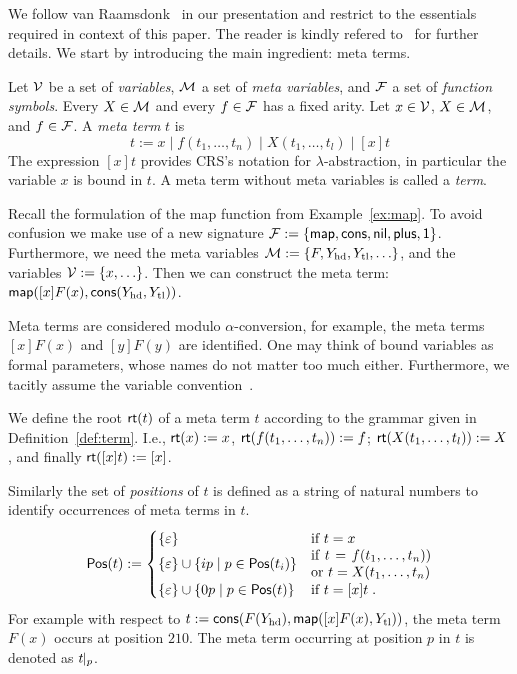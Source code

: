 We follow van Raamsdonk~\cite{2003_van_raamsdonk} in our presentation 
and restrict to the essentials required in context of this paper. The
reader is kindly refered to~\cite{2003_van_raamsdonk} for further details.
We start by introducing the main ingredient: meta terms. 
%
\begin{definition} \label{def:term} 
  Let $\mathcal{V}$ be a set of \emph{variables}, $\mathcal{M}$ a set of \emph{meta
    variables}, and $\mathcal{F}$ a set of \emph{function symbols}. Every
  $X \in \mathcal{M}$ and every $f \in \mathcal{F}$ has a fixed arity.
  Let $x \in \mathcal{V}$, $X \in \mathcal{M}$, and $f \in \mathcal{F}$. A \emph{meta term} $t$
  is
  \[ t := %
         x 
    \mid f( t_1, \ldots, t_n) 
    \mid X(t_1, \ldots, t_l)
  \mid [x] t
 \]
 The expression $[x] t$ provides CRS's notation for $\lambda$-abstraction, in
 particular the variable $x$ is bound in $t$.
 A meta term without meta variables is called a \emph{term}.
\end{definition}
%
\newcommand*{\Yhd}{Y_{\text{hd}}}
\newcommand*{\Ytl}{Y_{\text{tl}}}
\newcommand*{\alphaeq}{=_\alpha}

Recall the formulation of the map function from Example~\ref{ex:map}. To
avoid confusion we make use of a new signature $\mathcal{F} \mathrel{:=} \{ \mathsf{map}, \mathsf{cons}, \mathsf{nil}, \mathsf{plus}, \mathsf{1} \}$.
Furthermore, we need the meta variables $\M \defsym \{F, \Yhd, \Ytl, \ldots \}$, and 
the variables $\mathcal{V} \mathrel{:=} \{ x, \ldots \}$. Then we can construct the meta term:
$\map( [x] F(x), \cons( \Yhd, \Ytl))$.

Meta terms are considered modulo $\alpha$-conversion, for example,
the meta terms $[x]F(x)$ and $[y] F(y)$ are identified.
One may think of bound variables as formal parameters, whose names do
not matter too much either. Furthermore, we tacitly assume the
variable convention~\cite{2003_van_raamsdonk}.

We define the root $\operatorname{\mathsf{rt}}(t)$ of a meta term $t$ according
to the grammar given in Definition~\ref{def:term}. I.e., $\operatorname{\mathsf{rt}}(x) \mathrel{:=} x$,
$\operatorname{\mathsf{rt}}(f( t_1, \ldots, t_n)) \mathrel{:=} f$; $\operatorname{\mathsf{rt}}(X(t_1, \ldots, t_l)) \mathrel{:=} X$,
and finally $\operatorname{\mathsf{rt}}([x] t) \mathrel{:=} [x]$. 

Similarly the set of \emph{positions} of $t$ is defined as a string
of natural numbers to identify occurrences of meta terms in $t$.
%
\begin{equation*}
  \Pos(t) \defsym
  \begin{cases}
    \{\varepsilon\} 
          & \text{if $t = x$}\\
    \{\varepsilon\} \cup \{ip \mid p \in \Pos(t_i)\} 
          & \text{\parbox{20ex}{if $t = f(t_1, \ldots, t_n))$ or
            $t = X(t_1, \ldots, t_n)$}}\\
    \{\varepsilon\} \cup \{0p \mid p \in \Pos(t)\} 
          & \text{if $t = [x]t$}
          \tpkt    
  \end{cases}
\end{equation*}
%
For example with respect to $t \defsym \cons(F(\Yhd), \map([x]F(x), \Ytl))$,
the meta term $F(x)$ occurs at position $210$. The meta term occurring
at position $p$ in $t$ is denoted as ${{t}\!\!\mid_{p}}$.

